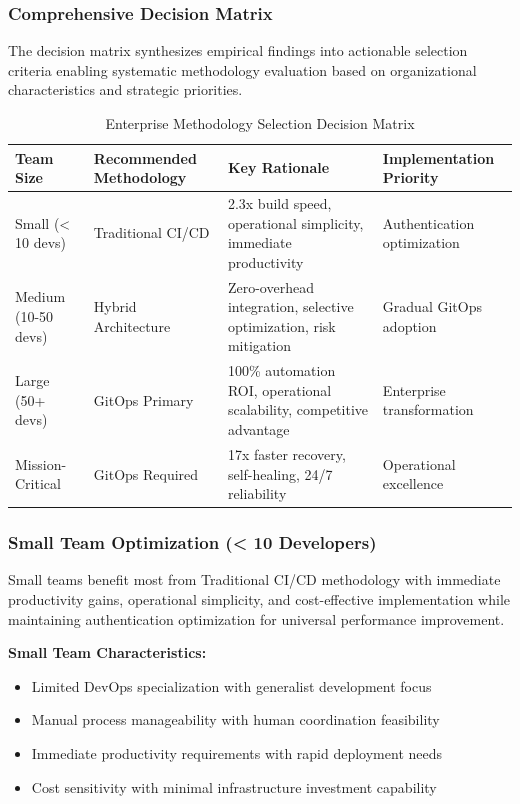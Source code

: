 \subsubsection{Comprehensive Decision Matrix}

The decision matrix synthesizes empirical findings into actionable selection criteria enabling systematic methodology evaluation based on organizational characteristics and strategic priorities.

\begin{table}[H]
\centering
\caption{Enterprise Methodology Selection Decision Matrix}
\label{tab:decision_matrix}
\begin{tabular}{|p{2.5cm}|p{3.5cm}|p{3.5cm}|p{4cm}|}
\hline
\textbf{Team Size} & \textbf{Recommended Methodology} & \textbf{Key Rationale} & \textbf{Implementation Priority} \\
\hline
Small (< 10 devs) & Traditional CI/CD & 2.3x build speed, operational simplicity, immediate productivity & Authentication optimization \\
\hline
Medium (10-50 devs) & Hybrid Architecture & Zero-overhead integration, selective optimization, risk mitigation & Gradual GitOps adoption \\
\hline
Large (50+ devs) & GitOps Primary & 100\% automation ROI, operational scalability, competitive advantage & Enterprise transformation \\
\hline
Mission-Critical & GitOps Required & 17x faster recovery, self-healing, 24/7 reliability & Operational excellence \\
\hline
\end{tabular}
\end{table}

\subsubsection{Small Team Optimization (< 10 Developers)}

Small teams benefit most from Traditional CI/CD methodology with immediate productivity gains, operational simplicity, and cost-effective implementation while maintaining authentication optimization for universal performance improvement.

\textbf{Small Team Characteristics:}
\begin{itemize}
\item Limited DevOps specialization with generalist development focus
\item Manual process manageability with human coordination feasibility
\item Immediate productivity requirements with rapid deployment needs
\item Cost sensitivity with minimal infrastructure investment capability
\end{itemize}

